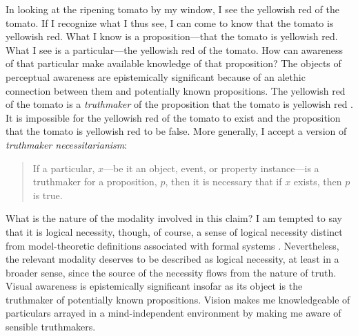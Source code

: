 \documentclass[12pt]{article}
\begin{document}
In looking at the ripening tomato by my window, I see the yellowish red of the tomato. If I recognize what I thus see, I can come to know that the tomato is yellowish red. What I know is a proposition---that the tomato is yellowish red. What I see is a particular---the yellowish red of the tomato. How can awareness of that particular make available knowledge of that proposition? The objects of perceptual awareness are epistemically significant because of an alethic connection between them and potentially known propositions. The yellowish red of the tomato is a \emph{truthmaker} of the proposition that the tomato is yellowish red \citep[see][]{Johnston:2006uq}. It is impossible for the yellowish red of the tomato to exist and the proposition that the tomato is yellowish red to be false. More generally, I accept a version of \emph{truthmaker necessitarianism}:
\begin{quote}
	If a particular, \( x \)---be it an object, event, or property instance---is a truthmaker for a proposition, \( p \), then it is necessary that if \( x \) exists, then \( p \) is true. 
\end{quote}
\citep[for a survey of recent work on truthmakers see][]{Rodriguez-Pereyra:2006fk} What is the nature of the modality involved in this claim? I am tempted to say that it is logical necessity, though, of course, a sense of logical necessity distinct from model-theoretic definitions associated with formal systems  \citep[for doubts about model-theoretic definitions of logical necessity see][]{Etchemendy:1988et,Etchemendy:1988sa}. Nevertheless, the relevant modality deserves to be described as logical necessity, at least in a broader sense, since the source of the necessity flows from the nature of truth. Visual awareness is epistemically significant insofar as its object is the truthmaker of potentially known propositions. Vision makes me knowledgeable of particulars arrayed in a mind-independent environment by making me aware of sensible truthmakers.

\end{document}
